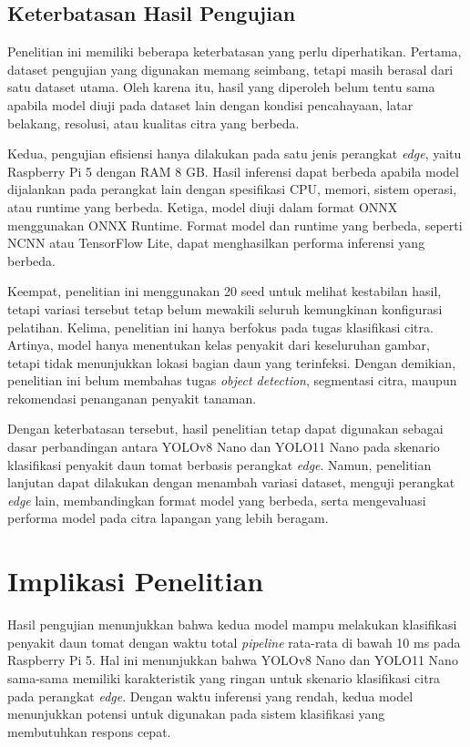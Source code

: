 \begin{sectioncontent}
    \subsection{Keterbatasan Hasil Pengujian}
    \begin{subsectioncontent}
        \hspace{\parindent}Penelitian ini memiliki beberapa keterbatasan yang perlu diperhatikan. Pertama, dataset pengujian yang digunakan memang seimbang, tetapi masih berasal dari satu dataset utama. Oleh karena itu, hasil yang diperoleh belum tentu sama apabila model diuji pada dataset lain dengan kondisi pencahayaan, latar belakang, resolusi, atau kualitas citra yang berbeda.

        Kedua, pengujian efisiensi hanya dilakukan pada satu jenis perangkat \textit{edge}, yaitu Raspberry Pi 5 dengan RAM 8 GB. Hasil inferensi dapat berbeda apabila model dijalankan pada perangkat lain dengan spesifikasi CPU, memori, sistem operasi, atau runtime yang berbeda. Ketiga, model diuji dalam format ONNX menggunakan ONNX Runtime. Format model dan runtime yang berbeda, seperti NCNN atau TensorFlow Lite, dapat menghasilkan performa inferensi yang berbeda.

        Keempat, penelitian ini menggunakan 20 seed untuk melihat kestabilan hasil, tetapi variasi tersebut tetap belum mewakili seluruh kemungkinan konfigurasi pelatihan. Kelima, penelitian ini hanya berfokus pada tugas klasifikasi citra. Artinya, model hanya menentukan kelas penyakit dari keseluruhan gambar, tetapi tidak menunjukkan lokasi bagian daun yang terinfeksi. Dengan demikian, penelitian ini belum membahas tugas \textit{object detection}, segmentasi citra, maupun rekomendasi penanganan penyakit tanaman.

        Dengan keterbatasan tersebut, hasil penelitian tetap dapat digunakan sebagai dasar perbandingan antara YOLOv8 Nano dan YOLO11 Nano pada skenario klasifikasi penyakit daun tomat berbasis perangkat \textit{edge}. Namun, penelitian lanjutan dapat dilakukan dengan menambah variasi dataset, menguji perangkat \textit{edge} lain, membandingkan format model yang berbeda, serta mengevaluasi performa model pada citra lapangan yang lebih beragam.
    \end{subsectioncontent}

    \section{Implikasi Penelitian}
    \begin{sectioncontent}
        \hspace{\parindent}Hasil pengujian menunjukkan bahwa kedua model mampu melakukan klasifikasi penyakit daun tomat dengan waktu total \textit{pipeline} rata-rata di bawah 10 ms pada Raspberry Pi 5. Hal ini menunjukkan bahwa YOLOv8 Nano dan YOLO11 Nano sama-sama memiliki karakteristik yang ringan untuk skenario klasifikasi citra pada perangkat \textit{edge}. Dengan waktu inferensi yang rendah, kedua model menunjukkan potensi untuk digunakan pada sistem klasifikasi yang membutuhkan respons cepat.


\end{sectioncontent}
\end{sectioncontent}
